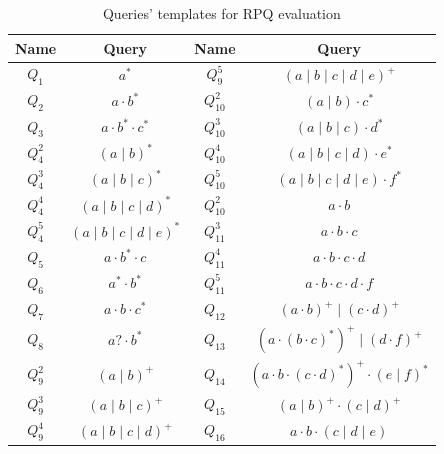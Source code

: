 \begin{table}
{\small
\renewcommand{\arraystretch}{1.25}
\begin{tabular}{|c|c||c|c|}
\hline

Name & Query & Name & Query \\
\hline
\hline 
$Q_1$   & $a^*$                               & $Q_9^5$    & $(a \mid b \mid c \mid d \mid e)^+$                     \\
$Q_2$   & $a\cdot b^*$                        & $Q_{10}^2$ & $(a \mid b) \cdot c^*$                                  \\
$Q_3$   & $a \cdot b^* \cdot c^*$             & $Q_{10}^3$ & $(a \mid b \mid c)  \cdot d^*$                          \\
$Q_4^2$ & $(a \mid b)^*$                      & $Q_{10}^4$ & $(a \mid b \mid c \mid d)  \cdot e^*$                   \\
$Q_4^3$ & $(a \mid b \mid c)^*$               & $Q_{10}^5$ & $(a \mid b \mid c \mid d \mid e)  \cdot f^*$            \\
$Q_4^4$ & $(a \mid b \mid c \mid d)^*$        & $Q_{10}^2$ & $a \cdot b$                                             \\
$Q_4^5$ & $(a \mid b \mid c \mid d \mid e)^*$ & $Q_{11}^3$ & $a \cdot b \cdot c$                                     \\
$Q_5$   & $a \cdot b^* \cdot c$               & $Q_{11}^4$ & $a \cdot b \cdot c \cdot d$                             \\
$Q_6$   & $a^* \cdot b^*$                     & $Q_{11}^5$ & $a \cdot b \cdot c \cdot d \cdot f$                     \\
$Q_7$   & $a \cdot b \cdot c^*$               & $Q_{12}$   & $(a \cdot b)^+ \mid  (c \cdot d)^+$                     \\
$Q_8$   & $a? \cdot b^*$                      & $Q_{13}$   & $(a \cdot(b \cdot c)^*)^+ \mid  (d \cdot f)^+$          \\
$Q_9^2$ & $(a \mid b)^+$                      & $Q_{14}$   & $(a \cdot b \cdot (c \cdot d)^*)^+  \cdot (e \mid f)^*$ \\
$Q_9^3$ & $(a \mid b \mid c)^+$               & $Q_{15}$   & $(a \mid b)^+ \cdot (c \mid d)^+$                       \\
$Q_9^4$ & $(a \mid b \mid c \mid d)^+$        & $Q_{16}$   & $a \cdot b \cdot (c \mid d \mid e)$                     \\
\hline
\end{tabular}
}
\caption{Queries' templates for RPQ evaluation}
\label{tbl:queries_templates}
\end{table}



